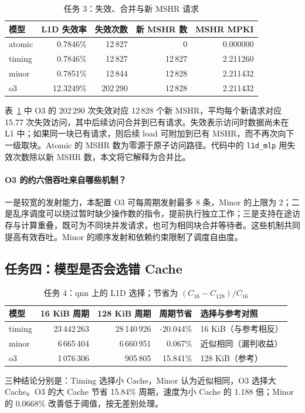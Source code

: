\documentclass[12pt,a4paper,fontset=mac]{ctexart}
\begin{document}
\begin{table}[H]\centering\small
\caption{任务 3：失效、合并与新 MSHR 请求}\label{tab:mshr}
\begin{tabular}{lrrrr}\toprule
模型 & L1D 失效率 & 失效次数 & 新 MSHR 数 & MSHR MPKI \\\midrule
atomic & 0.7846\% & 12\,827 & 0 & 0.000000 \\
timing & 0.7846\% & 12\,827 & 12\,827 & 2.211260 \\
minor & 0.7851\% & 12\,844 & 12\,828 & 2.211432 \\
o3 & 12.3249\% & 202\,290 & 12\,828 & 2.211432 \\
\bottomrule\end{tabular}\end{table}
表~\ref{tab:mshr} 中 O3 的 202\,290 次失效对应 12\,828 个新 MSHR，平均每个新请求对应 15.77 次失效访问，其中后续访问合并到已有请求。失效表示访问时数据尚未在 L1 中；如果同一块已有请求，则后续 load 可附加到已有 MSHR，而不再次向下一级取块。Atomic 的 MSHR 数为零源于原子访问路径。代码中的 \texttt{l1d\_mlp} 用失效次数除以新 MSHR 数，本文将它解释为合并比。

\paragraph{O3 的约六倍吞吐来自哪些机制？}
一是较宽的发射能力，本配置 O3 可每周期发射最多 8 条，Minor 的上限为 2；二是乱序调度可以绕过暂时缺少操作数的指令，提前执行独立工作；三是支持在途访存与计算重叠，既可为不同块并发请求，也可为相同块合并等待者。这些机制共同提高有效吞吐。Minor 的顺序发射和依赖约束限制了调度自由度。

\subsection{任务四：模型是否会选错 Cache}
\begin{table}[H]\centering\small
\caption{任务 4：qnn 上的 L1D 选择；节省为 $(C_{16}-C_{128})/C_{16}$}\label{tab:fid}
\begin{tabular}{lrrrl}\toprule
模型 & 16 KiB 周期 & 128 KiB 周期 & 周期节省 & 选择与参考对照 \\\midrule
timing & 23\,442\,263 & 28\,140\,926 & -20.044\% & 16 KiB（与参考相反） \\
minor & 6\,665\,404 & 6\,660\,951 & 0.067\% & 近似相同（漏判收益） \\
o3 & 1\,076\,306 & 905\,805 & 15.841\% & 128 KiB（参考） \\
\bottomrule\end{tabular}\end{table}
三种结论分别是：Timing 选择小 Cache，Minor 认为近似相同，O3 选择大 Cache。O3 的大 Cache 节省 15.84\% 周期，速度为小 Cache 的 1.188 倍；Minor 的 0.0668\% 改善低于阈值，按无差别处理。
\end{document}
